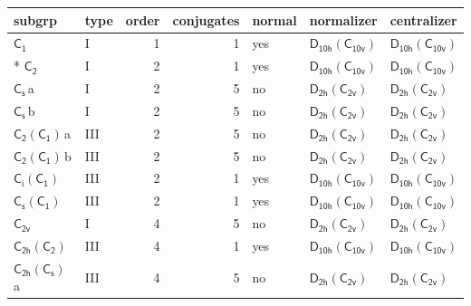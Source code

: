 \documentclass[10pt,a4paper]{article}
\numberwithin{equation}{section}
\newcommand{\grp}[1]{\mathsf{#1}}
\newcommand{\clsletter}[1]{\,{\scriptsize\color{black!55}#1}}
\begin{document}
{\small\begin{longtable}{@{}llrrlll@{}}\toprule
subgrp & type & order & conjugates & normal & normalizer & centralizer\\\midrule\endhead
\bottomrule\endfoot\endlastfoot
\href{../../../rotation/data/pdf/C1.pdf}{$\grp{C_{1}}$} & I & 1 & 1 & yes & \href{D10h-C10v.pdf}{$\grp{D_{10h}}(\grp{C_{10v}})$} & \href{D10h-C10v.pdf}{$\grp{D_{10h}}(\grp{C_{10v}})$}\\*
\href{../../../rotation/data/pdf/C2.pdf}{$\grp{C_{2}}$} & I & 2 & 1 & yes & \href{D10h-C10v.pdf}{$\grp{D_{10h}}(\grp{C_{10v}})$} & \href{D10h-C10v.pdf}{$\grp{D_{10h}}(\grp{C_{10v}})$}\\
\href{../../../rotation/data/pdf/C1v.pdf}{$\grp{C_{s}}$}\clsletter{a} & I & 2 & 5 & no & \href{D2h-C2v.pdf}{$\grp{D_{2h}}(\grp{C_{2v}})$} & \href{D2h-C2v.pdf}{$\grp{D_{2h}}(\grp{C_{2v}})$}\\
\href{../../../rotation/data/pdf/C1v.pdf}{$\grp{C_{s}}$}\clsletter{b} & I & 2 & 5 & no & \href{D2h-C2v.pdf}{$\grp{D_{2h}}(\grp{C_{2v}})$} & \href{D2h-C2v.pdf}{$\grp{D_{2h}}(\grp{C_{2v}})$}\\
\href{C2-C1.pdf}{$\grp{C_{2}}(\grp{C_{1}})$}\clsletter{a} & III & 2 & 5 & no & \href{D2h-C2v.pdf}{$\grp{D_{2h}}(\grp{C_{2v}})$} & \href{D2h-C2v.pdf}{$\grp{D_{2h}}(\grp{C_{2v}})$}\\
\href{C2-C1.pdf}{$\grp{C_{2}}(\grp{C_{1}})$}\clsletter{b} & III & 2 & 5 & no & \href{D2h-C2v.pdf}{$\grp{D_{2h}}(\grp{C_{2v}})$} & \href{D2h-C2v.pdf}{$\grp{D_{2h}}(\grp{C_{2v}})$}\\
\href{S2-C1.pdf}{$\grp{C_{i}}(\grp{C_{1}})$} & III & 2 & 1 & yes & \href{D10h-C10v.pdf}{$\grp{D_{10h}}(\grp{C_{10v}})$} & \href{D10h-C10v.pdf}{$\grp{D_{10h}}(\grp{C_{10v}})$}\\
\href{C1v-C1.pdf}{$\grp{C_{s}}(\grp{C_{1}})$} & III & 2 & 1 & yes & \href{D10h-C10v.pdf}{$\grp{D_{10h}}(\grp{C_{10v}})$} & \href{D10h-C10v.pdf}{$\grp{D_{10h}}(\grp{C_{10v}})$}\\
\href{../../../rotation/data/pdf/C2v.pdf}{$\grp{C_{2v}}$} & I & 4 & 5 & no & \href{D2h-C2v.pdf}{$\grp{D_{2h}}(\grp{C_{2v}})$} & \href{D2h-C2v.pdf}{$\grp{D_{2h}}(\grp{C_{2v}})$}\\
\href{C2h-C2.pdf}{$\grp{C_{2h}}(\grp{C_{2}})$} & III & 4 & 1 & yes & \href{D10h-C10v.pdf}{$\grp{D_{10h}}(\grp{C_{10v}})$} & \href{D10h-C10v.pdf}{$\grp{D_{10h}}(\grp{C_{10v}})$}\\
\href{C2h-C1v.pdf}{$\grp{C_{2h}}(\grp{C_{s}})$}\clsletter{a} & III & 4 & 5 & no & \href{D2h-C2v.pdf}{$\grp{D_{2h}}(\grp{C_{2v}})$} & \href{D2h-C2v.pdf}{$\grp{D_{2h}}(\grp{C_{2v}})$}\\

\end{longtable}}
\end{document}
